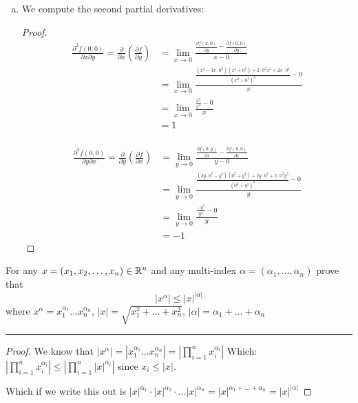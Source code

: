 \documentclass[11pt]{article}
\begin{document}
\begin{enumerate}[(a)]
    \item We compute the second partial derivatives:
    \begin{proof}
        
        \begin{align*}
            \frac{\partial ^2 f(0,0)}{\partial x \partial y} = \frac{\partial}{\partial x} \left( \frac{\partial f}{\partial y} \right) &= 
                \lim_{x \to 0} \frac{\frac{\partial f(x,0)}{\partial y} - \frac{\partial f(0,0)}{\partial y}}{x - 0}\\
            &= \lim_{x \to 0} \frac{\frac{(x^3 - 3x \cdot 0^2)(x^2 + 0^2) + 2 \cdot 0^2x^3 + 2x \cdot 0^4}{(x^2 + 0^2)^2} - 0}{x} \\
            &= \lim_{x \to 0} \frac{\frac{x^5}{x^4} - 0}{x} \\
            &= 1\\
        \end{align*}

        \begin{align*}
            \frac{\partial ^2 f(0,0)}{\partial y \partial x} = \frac{\partial}{\partial y} \left( \frac{\partial f}{\partial x} \right) &= 
                \lim_{y \to 0} \frac{\frac{\partial f(0,y)}{\partial x} - \frac{\partial f(0,0)}{\partial x}}{y - 0}\\
            &= \lim_{y \to 0} \frac{\frac{(3y \cdot 0^2 - y^3)(0^2 + y^2) + 2y \cdot 0^4 + 2 \cdot 0^2y^3}{(0^2 + y^2)^2} - 0}{y}\\
            &= \lim_{y \to 0} \frac{\frac{- y^5}{y^4} - 0}{y}\\
            &= -1
        \end{align*}

    \end{proof}
\end{enumerate}





For any $x = (x_1, x_2, \dots, x_n) \in \mathbb{R} ^n$ and any multi-index $\alpha = (\alpha_1, \dots, \alpha_n)$ prove that 
$$|x^\alpha| \leq |x|^{|\alpha|}$$
where $x^\alpha = x_1^{\alpha_1} \dots x_n^{\alpha_n}$, $|x| = \sqrt{x_1^2 + \dots + x_n^2}$, $|\alpha| = \alpha_1 + \dots + \alpha_n$

\hrule

\begin{proof}
    
    We know that $ |x^\alpha| = |x_1^{\alpha_1} \dots x_n^{\alpha_n}| = \left| \prod_{i = 1} ^n x_i^{\alpha_i} \right|$
    Which: $\left| \prod_{i = 1} ^n x_i^{\alpha_i} \right| \leq \left| \prod_{i = 1} ^n |x|^{\alpha_i} \right|$ since $x_i \leq |x|$.

    Which if we write this out is $|x|^{\alpha_1} \cdot |x|^{\alpha_2} \cdot \dots |x|^{\alpha_n} = |x|^{\alpha_1 + \dots + \alpha_n} = |x|^{|\alpha|}$

\end{proof}
\end{document}
